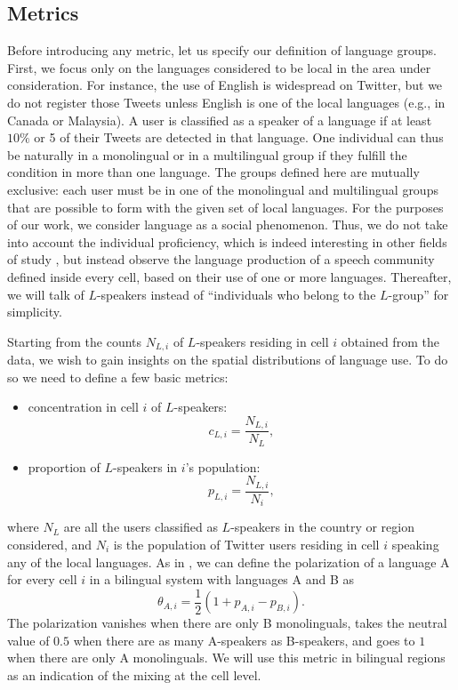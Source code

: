 \documentclass[../thesis.tex]{subfiles}
\begin{document}
\subsection{Metrics}
Before introducing any metric, let us specify our definition of language groups. First,
we focus only on the languages considered to be local in the area under consideration.
For instance, the use of English is widespread on Twitter, but we do not register those
Tweets unless English is one of the local languages (e.g., in Canada or Malaysia). A
user is classified as a speaker of a language if at least $10\%$ or 5 of their Tweets
are detected in that language. One individual can thus be naturally in a monolingual or
in a multilingual group if they fulfill the condition in more than one language. The
groups defined here are mutually exclusive: each user must be in one of the monolingual
and multilingual groups that are possible to form with the given set of local languages.
For the purposes of our work, we consider language as a social phenomenon. Thus, we do
not take into account the individual proficiency, which is indeed interesting in other
fields of study \cite{BakerFoundationsBilingual1997}, but instead observe the language
production of a speech community defined inside every cell, based on their use of one or
more languages. Thereafter, we will talk of $L$-speakers instead of ``individuals who
belong to the $L$-group'' for simplicity.

Starting from the counts $N_{L,i}$ of $L$-speakers residing in cell $i$ obtained from
the data, we wish to gain insights on the spatial distributions of language use. To do
so we need to define a few basic metrics:
\begin{itemize}
       \item concentration in cell $i$ of $L$-speakers:
       \begin{equation}
       \label{eq:def_conc}
              c_{L,i} = \frac{N_{L,i}}{N_L},
       \end{equation}
       \item proportion of $L$-speakers in $i$'s population:
       \begin{equation}
       \label{eq:def_prop}
              p_{L,i} = \frac{N_{L,i}}{N_i},
       \end{equation}
\end{itemize}
where $N_L$ are all the users classified as $L$-speakers in the country or region
considered, and $N_i$ is the population of Twitter users residing in cell $i$ speaking
any of the local languages. As in \cite{MocanuTwitterBabel2013}, we can define the
polarization of a language A for every cell $i$ in a bilingual system with languages A
and B as 
\begin{equation}
\label{eq:def_polar}
    \theta_{A, i} = \frac{1}{2} (1 + p_{A,i} - p_{B,i}). 
\end{equation}
The polarization vanishes when there are only B monolinguals, takes the neutral value of
$0.5$ when there are as many A-speakers as B-speakers, and goes to $1$ when there are
only A monolinguals. We will use this metric in bilingual regions as an indication of
the mixing at the cell level. 
\end{document}
